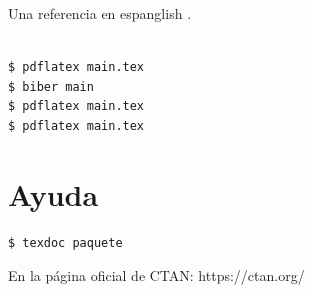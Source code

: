 Una referencia en espanglish \citet{garey1979}.

%

\begin{verbatim}

$ pdflatex main.tex
$ biber main
$ pdflatex main.tex
$ pdflatex main.tex
\end{verbatim}

\printbibliography

\section{Ayuda}

\begin{verbatim}
$ texdoc paquete
\end{verbatim}

En la página oficial de CTAN: https://ctan.org/